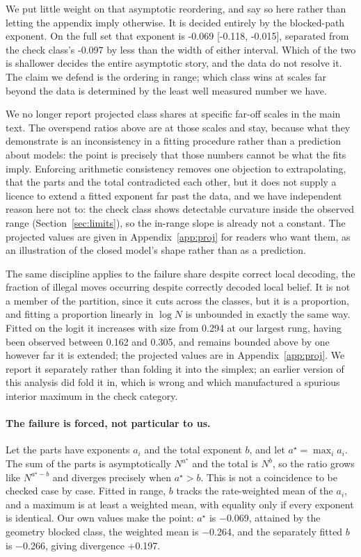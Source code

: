 \documentclass[11pt]{article}
\begin{document}
We put little weight on that asymptotic reordering, and say so here rather than
letting the appendix imply otherwise. It is decided entirely by the blocked-path
exponent. On the full set that exponent is -0.069 [-0.118,
-0.015], separated from the check class's -0.097 by less than the width
of either interval. Which of the two is shallower decides the entire asymptotic
story, and the data do not resolve it. The claim we defend is the ordering in range; which class wins at
scales far beyond the data is determined by the least well measured number we have.

We no longer report projected class shares at specific far-off scales in the main
text. The overspend ratios above are at those scales and stay, because what they
demonstrate is an inconsistency in a fitting procedure rather than a prediction about
models: the point is precisely that those numbers cannot be what the fits imply.
Enforcing
arithmetic consistency removes one objection to extrapolating, that the parts and the
total contradicted each other, but it does not supply a licence to extend a fitted
exponent far past the data, and we have independent reason here not to: the check
class shows detectable curvature inside the observed range (Section~\ref{sec:limits}),
so the in-range slope is already not a constant. The projected values are given in
Appendix~\ref{app:proj} for readers who want them, as an illustration of the closed
model's shape rather than as a prediction.

The same discipline applies to the failure share despite correct local decoding,
the fraction of illegal moves
occurring despite correctly decoded local belief. It is not a member of the
partition, since it cuts across the classes, but it is a proportion, and fitting a
proportion linearly in $\log N$ is unbounded in exactly the same way. Fitted on the
logit it increases with size from 0.294 at our largest rung, having been
observed between 0.162 and 0.305, and remains bounded above
by one however far it is extended; the projected values are in
Appendix~\ref{app:proj}. We report
it separately rather than folding it into the simplex; an earlier version of this
analysis did fold it in, which is wrong and which manufactured a spurious interior
maximum in the check category.

\paragraph{The failure is forced, not particular to us.}
Let the parts have exponents $a_i$ and the total exponent $b$, and let
$a^\star=\max_i a_i$. The sum of the parts is asymptotically $N^{a^\star}$ and the
total is $N^{b}$, so the ratio grows like $N^{a^\star-b}$ and diverges precisely
when $a^\star>b$. This is not a coincidence to be checked case by case. Fitted in
range, $b$ tracks the rate-weighted mean of the $a_i$, and a maximum is at least a
weighted mean, with equality only if every exponent is identical. Our own values
make the point: $a^\star$ is $-$0.069, attained by the geometry blocked class,
the weighted mean is
$-$0.264, and the separately fitted $b$ is $-$0.266, giving
divergence +0.197.
\end{document}
